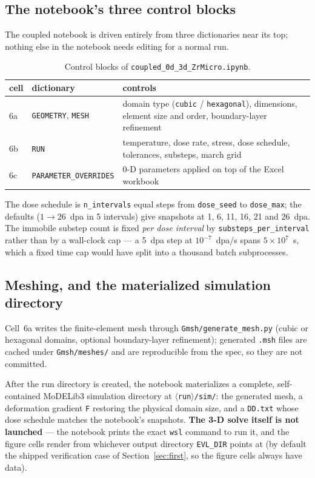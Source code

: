 \documentclass[11pt]{article}
\newcommand{\MoD}{\textsf{MoDELib3}}
\newcommand{\code}[1]{\texttt{\small #1}}
\newcommand{\file}[1]{\texttt{\footnotesize #1}}
\begin{document}
\subsection{The notebook's three control blocks}
\label{sec:controls}

The coupled notebook is driven entirely from three dictionaries near its
top; nothing else in the notebook needs editing for a normal run.

\begin{table}[htbp]
\centering
\caption{Control blocks of \file{coupled\_0d\_3d\_ZrMicro.ipynb}.}
\label{tab:controls}
\begin{tabular}{@{}llp{}@{}}
\toprule
cell & dictionary & controls \\
\midrule
6a & \code{GEOMETRY}, \code{MESH} & domain type (\code{cubic} /
\code{hexagonal}), dimensions, element size and order, boundary-layer
refinement \\
6b & \code{RUN} & temperature, dose rate, stress, dose schedule, tolerances,
substeps, march grid \\
6c & \code{PARAMETER\_OVERRIDES} & 0-D parameters applied on top of the
Excel workbook \\
\bottomrule
\end{tabular}
\end{table}

The dose schedule is \code{n\_intervals} equal steps from \code{dose\_seed}
to \code{dose\_max}; the defaults ($1 \rightarrow 26$~dpa in 5 intervals)
give snapshots at 1, 6, 11, 16, 21 and 26~dpa. The immobile substep count is
fixed \emph{per dose interval} by \code{substeps\_per\_interval} rather than
by a wall-clock cap --- a 5~dpa step at $10^{-7}$~dpa/s spans
$5\times10^{7}$~s, which a fixed time cap would have split into a thousand
batch subprocesses.

\subsection{Meshing, and the materialized simulation directory}

Cell~6a writes the finite-element mesh through
\file{Gmsh/generate\_mesh.py} (cubic or hexagonal domains,
optional boundary-layer refinement); generated \file{.msh} files are cached
under \file{Gmsh/meshes/} and are reproducible from the spec, so they are not
committed.

After the run directory is created, the notebook materializes a complete,
self-contained \MoD{} simulation directory at
\file{$\langle$run$\rangle$/sim/}: the generated mesh, a deformation gradient
\code{F} restoring the physical domain size, and a \file{DD.txt} whose dose
schedule matches the notebook's snapshots. \textbf{The 3-D solve itself is
not launched} --- the notebook prints the exact \code{wsl} command to run it,
and the figure cells render from whichever output directory \code{EVL\_DIR}
points at (by default the shipped verification case of
Section~\ref{sec:first}, so the figure cells always have data).
\end{document}

